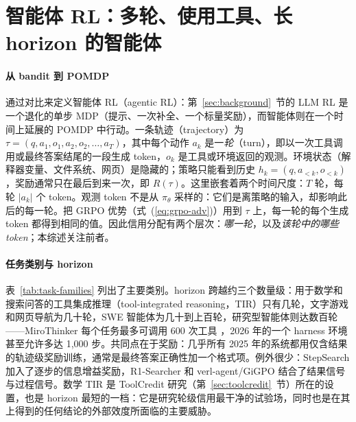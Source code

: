 \section{智能体 RL：多轮、使用工具、长 horizon 的智能体}\label{sec:agentic}

\paragraph{从 bandit 到 POMDP}
\citet{zhang2025landscape} 通过对比来定义智能体 RL（agentic RL）：第~\ref{sec:background}~节的 LLM RL 是一个退化的单步 MDP（提示、一次补全、一个标量奖励），而智能体则在一个时间上延展的 POMDP 中行动。一条轨迹（trajectory）为 $\tau=(q,a_1,o_1,a_2,o_2,\dots,a_T)$，其中每个动作 $a_k$ 是一\emph{轮}（turn），即以一次工具调用或最终答案结尾的一段生成 token，$o_k$ 是工具或环境返回的观测。环境状态（解释器变量、文件系统、网页）是隐藏的；策略只能看到历史 $h_k=(q,a_{<k},o_{<k})$，奖励通常只在最后到来一次，即 $R(\tau)$。这里嵌套着两个时间尺度：$T$ 轮，每轮 $|a_k|$ 个 token。观测 token 不是从 $\pi_\theta$ 采样的：它们是离策略的输入，却影响此后的每一轮。把 GRPO 优势（式~(\ref{eq:grpo-adv})）用到 $\tau$ 上，每一轮的每个生成 token 都得到相同的值。因此信用分配有两个层次：\emph{哪一轮}，以及\emph{该轮中的哪些 token}；本综述关注前者。

\paragraph{任务类别与 horizon}
表~\ref{tab:task-families} 列出了主要类别。horizon 跨越约三个数量级：用于数学和搜索问答的工具集成推理（tool-integrated reasoning，TIR）只有几轮，文字游戏和网页导航为几十轮，SWE 智能体为几十到上百轮，研究型智能体则达数百轮——MiroThinker 每个任务最多可调用 600 次工具 \citep{miromind2025mirothinker}，2026 年的一个 harness 环境甚至允许多达 1{,}000 步\unverified。共同点在于奖励：几乎所有 2025 年的系统都用仅含结果的轨迹级奖励训练，通常是最终答案正确性加一个格式项。例外很少：StepSearch \citep{wang2025stepsearch} 加入了逐步的信息增益奖励\unverified，R1-Searcher \citep{song2025r1} 和 verl-agent/GiGPO \citep{feng2025group} 结合了结果信号与过程信号。数学 TIR 是 ToolCredit 研究（第~\ref{sec:toolcredit}~节）所在的设置，也是 horizon 最短的一档：它是研究轮级信用最干净的试验场，同时也是在其上得到的任何结论的外部效度所面临的主要威胁。

